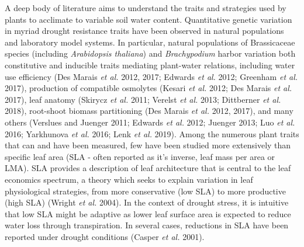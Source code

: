\documentclass[jou,floatsintext]{apa6}
\begin{document}
A deep body of literature aims to understand the traits and strategies used by plants to acclimate to variable soil water content. Quantitative genetic variation in myriad drought resistance traits have been observed in natural populations and laboratory model systems. In particular, natural populations of Brassicaceae species (including \emph{Arabidopsis thaliana}) and \emph{Brachypodium} harbor variation both constitutive and inducible traits mediating plant-water relations, including water use efficiency (Des Marais \emph{et al.} 2012, 2017; Edwards \emph{et al.} 2012; Greenham \emph{et al.} 2017), production of compatible osmolytes (Kesari \emph{et al.} 2012; Des Marais \emph{et al.} 2017), leaf anatomy (Skirycz \emph{et al.} 2011; Verelst \emph{et al.} 2013; Dittberner \emph{et al.} 2018), root-shoot biomass partitioning (Des Marais \emph{et al.} 2012, 2017), and many others (Verslues and Juenger 2011; Edwards \emph{et al.} 2012; Juenger 2013; Luo \emph{et al.} 2016; Yarkhunova \emph{et al.} 2016; Lenk \emph{et al.} 2019). Among the numerous plant traits that can and have been measured, few have been studied more extensively than specific leaf area (SLA - often reported as it's inverse, leaf mass per area or LMA). SLA provides a description of leaf architecture that is central to the leaf economics spectrum, a theory which seeks to explain variation in leaf physiological strategies, from more conservative (low SLA) to more productive (high SLA) (Wright \emph{et al.} 2004). In the context of drought stress, it is intuitive that low SLA might be adaptive as lower leaf surface area is expected to reduce water loss through transpiration. In several cases, reductions in SLA have been reported under drought conditions (Casper \emph{et al.} 2001).
\end{document}

